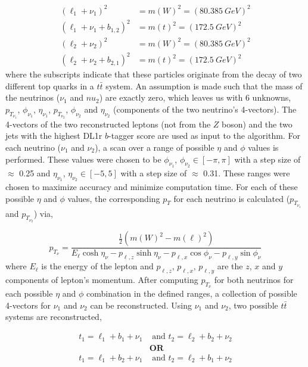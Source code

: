 \begin{align}
    (\ell_{1} + \nu_{1})^{2} &= m(W)^{2} = (\SI{80.385}{GeV})^2\\
    (\ell_{1} + \nu_{1} + b_{1,2})^{2} &= m(t)^{2} = (\SI{172.5}{GeV})^{2}\\
    (\ell_{2} + \nu_{2})^{2} &= m(W)^{2} = (\SI{80.385}{GeV})^2\\
       (\ell_{2} + \nu_{2} + b_{2,1})^{2} &= m(t)^{2} = (\SI{172.5}{GeV})^{2}
\end{align}
where the subscripts indicate that these particles originate from the decay of two different top quarks in a $t\bar{t}$ system. An assumption is made such that the mass of the neutrinos ($\nu_{1}$ and $nu_{2}$) are exactly zero, which leaves us with 6 unknowns, $p_{{T}_{\nu_{1}}}$, $\phi_{\nu_{1}}$, $\eta_{\nu_{1}}$, $p_{{T}_{\nu_{2}}}$, $\phi_{\nu_{2}}$ and $\eta_{\nu_{2}}$ (components of the two neutrino's 4-vectors). The 4-vectors of the two reconstructed leptons (not from the $Z$ boson) and the two jets with the highest DL1r $b$-tagger score are used as input to the algorithm. For each neutrino ($\nu_{1}$ and $\nu_{2}$), a scan over a range of possible $\eta$ and $\phi$ values is performed. These values were chosen to be $\phi_{\nu_{1}}$, $\phi_{\nu_{2}} \in [-\pi,\pi]$ with a step size of $\approx$ 0.25 and $\eta_{\nu_{1}}$, $\eta_{\nu_{2}} \in [-5,5]$ with a step size of $\approx$ 0.31. These ranges were chosen to maximize accuracy and minimize computation time. For each of these possible $\eta$ and $\phi$ values, the corresponding $p_{T}$ for each neutrino is calculated ($p_{{T}_{\nu_{1}}}$ and $p_{{T}_{\nu_{2}}}$) via,

\begin{equation}
    p_{{T}_{\nu}} = \frac{\frac{1}{2} (m(W)^{2} - m(\ell)^{2})}{E_{\ell}\cosh{\eta_{\nu}} - p_{\ell,z}\sinh{\eta_{\nu}} - p_{\ell,x}\cos{\phi_{\nu}} - p_{\ell,y}\sin{\phi_{\nu}} }
\end{equation}
where $E_{\ell}$ is the energy of the lepton and $p_{\ell, z}$, $p_{\ell, x}$, $p_{\ell, y}$ are the $z$, $x$ and $y$ components of lepton's momentum. After computing $p_{{T}_{\nu}}$ for both neutrinos for each possible $\eta$ and $\phi$ combination in the defined ranges, a collection of possible 4-vectors for $\nu_{1}$ and $\nu_{2}$ can be reconstructed. Using $\nu_{1}$ and $\nu_{2}$, two possible $t\bar{t}$ systems are reconstructed,

\begin{align}
    t_{1} = \ell_{1} + b_{1} + \nu_{1} &\text{ and } t_{2} = \ell_{2} + b_{2} + \nu_{2} \label{eq:top1-2vSM}\\
    &\textbf{OR}\nonumber\\ 
     t_{1} = \ell_{1} + b_{2} + \nu_{1} &\text{ and } t_{2} = \ell_{2} + b_{1} + \nu_{2} \label{eq:top2-2vSM}
\end{align}

